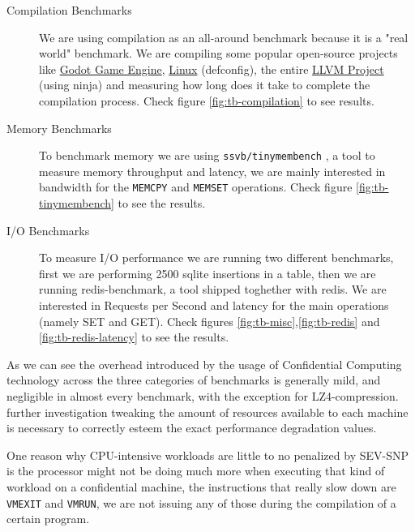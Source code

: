 \documentclass[twocolumn]{article}
\begin{document}
\begin{description}
    \item[Compilation Benchmarks] We are using compilation as an all-around benchmark because it is a "real world" benchmark. We are compiling some popular open-source projects like \href{https://github.com/godotengine/godot}{Godot Game Engine}, \href{https://git.kernel.org/pub/scm/linux/kernel/git/torvalds/linux.git}{Linux} (defconfig), the entire \href{https://github.com/llvm/llvm-project}{LLVM Project} (using ninja) and measuring how long does it take to complete the compilation process. Check figure \ref{fig:tb-compilation} to see results.
    \item[Memory Benchmarks] To benchmark memory we are using \texttt{ssvb/tinymembench} \cite{tinymembench}, a tool to measure memory throughput and latency, we are mainly interested in bandwidth for the \texttt{MEMCPY} and \texttt{MEMSET} operations. Check figure \ref{fig:tb-tinymembench} to see the results.
    \item[I/O Benchmarks] To measure I/O performance we are running two different benchmarks, first we are performing 2500 sqlite insertions in a table, then we are running redis-benchmark, a tool shipped toghether with redis. We are interested in Requests per Second and latency for the main operations (namely SET and GET). Check figures \ref{fig:tb-misc},\ref{fig:tb-redis} and \ref{fig:tb-redis-latency} to see the results.
\end{description}

As we can see the overhead introduced by the usage of Confidential Computing technology across the three categories of benchmarks is generally mild, and negligible in almost every benchmark, with the exception for LZ4-compression. further investigation tweaking the amount of resources available to each machine is necessary to correctly esteem the exact performance degradation values.

One reason why CPU-intensive workloads are little to no penalized by SEV-SNP is the processor might not be doing much more when executing that kind of workload on a confidential machine, the instructions that really slow down are \texttt{VMEXIT} and \texttt{VMRUN}, we are not issuing any of those during the compilation of a certain program.
\end{document}
